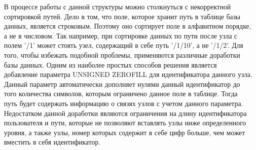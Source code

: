 \documentclass[a4paper,14pt]{extreport}
\theoremstyle{definition}
\begin{document}
\begin{table}[H]
\end{table}
В процессе работы с данной структуры можно столкнуться с некорректной сортировкой путей. Дело в том, что поле, которое хранит путь в таблице базы данных, является строковым. Поэтому оно сортирует поле в алфавитном порядке, а не в числовом. Так например, при сортировке данных по пути после узла с полем '/1' может стоять узел, содержащий в себе путь '/1/10', а не '/1/2'. Для того, чтобы избежать подобной проблемы, применяются различные доработки базы данных. Одним из наиболее простых способов решения является добавление параметра UNSIGNED ZEROFILL  для идентификатора данного узла. Данный параметр автоматически дополняет нулями данный идентификатор до того количества символов, которым ограничено данное поле в таблице. Тогда путь будет содержать информацию о связях узлов с учетом данного параметра. Недостатком данной доработки являются ограничения на длину идентификатора пользователя и пути, которые не позволяют вставлять узлы ниже определенного уровня, а также узлы, номер которых содержит в себе цифр больше, чем может вместить в себя идентификатор.
\end{document}

